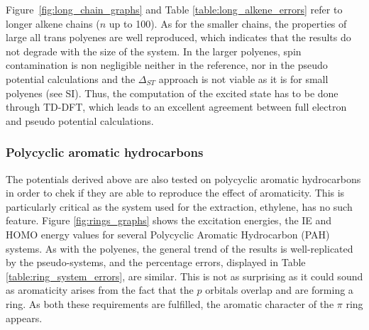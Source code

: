 \documentclass[12pt]{article}
\begin{document}
Figure~\ref{fig:long_chain_graphs} and Table \ref{table:long_alkene_errors} refer to longer 
alkene chains (\(n\) up to 100).
As for the smaller chains, the properties of large all trans polyenes are well reproduced,
which indicates that the results do not degrade with the size of the system.
In the larger polyenes, spin contamination is non negligible neither in the reference, 
nor in the pseudo potential calculations and the $\Delta_{ST}$ approach
is not viable as it is for small polyenes (see SI).
Thus, the computation of the excited state has to be done through TD-DFT, which leads to an
excellent agreement between full electron and pseudo potential calculations.

\subsubsection*{\sffamily \large Polycyclic aromatic hydrocarbons}

The potentials derived above are also tested on polycyclic aromatic hydrocarbons
in order to chek if they are able to reproduce the effect of aromaticity.
This is particularly critical as the system used for the extraction, ethylene, has no such feature.
Figure \ref{fig:rings_graphs} shows the excitation energies, the IE and
HOMO energy values for several Polycyclic Aromatic Hydrocarbon (PAH) systems.
As with the polyenes, the general trend of the results is well-replicated
by the pseudo-systems, and the percentage errors, displayed in Table
\ref{table:ring_system_errors}, are similar.
This is not as surprising as it could sound as aromaticity arises from the fact that
the $p$ orbitals overlap and are forming a ring.
As both these requirements are fulfilled, the aromatic character of the $\pi$ ring
appears.

%
%
\end{document}
